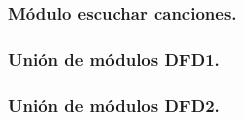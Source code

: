 \documentclass[12pt,a4paper]{article}
\begin{document}
\subsubsection{Módulo escuchar canciones.}
\subsubsection{Unión de módulos DFD1.}
\begin{center}
\end{center}
\subsubsection{Unión de módulos DFD2.}
\begin{center}
\end{center}
\end{document}
